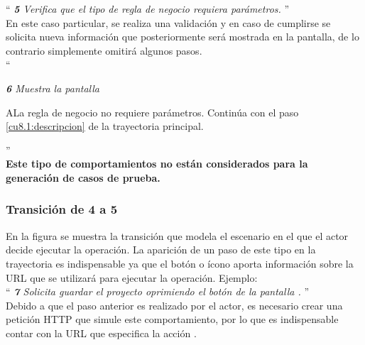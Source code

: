   ``{\it
 {\bf 5} \UCsist Verifica que el tipo de regla de negocio requiera parámetros. }''\\
   
 En este caso particular, se realiza una validación y en caso de cumplirse se solicita nueva información que posteriormente será mostrada en la pantalla, de lo contrario simplemente omitirá algunos pasos.\\
 
 ``{\it
 {\bf 6} \UCsist Muestra la pantalla \\
 
 \begin{UCtrayectoriaA}{A}{La regla de negocio no requiere parámetros.}
	\UCpaso[] Continúa con el paso \ref{cu8.1:descripcion} de la trayectoria principal.
 \end{UCtrayectoriaA}
 }''\\
	
  	{\bf Este tipo de comportamientos no están considerados para la generación de casos de prueba.}
	
 \subsubsection{Transición de 4 a 5} 
 
 En la figura  se muestra la transición que modela el escenario en el que el actor decide ejecutar la operación.
La aparición de un paso de este tipo en la trayectoria es indispensable ya que el botón o ícono aporta información sobre la URL que se utilizará para ejecutar la operación. Ejemplo:\\

``{\it
    {\bf 7} \UCactor Solicita guardar el proyecto oprimiendo el botón  de la pantalla .  
}''\\

	Debido a que el paso anterior es realizado por el actor, es necesario crear una petición HTTP que simule este comportamiento, por lo que es indispensable contar con la URL que especifica la acción .\\
	  
\clearpage	
